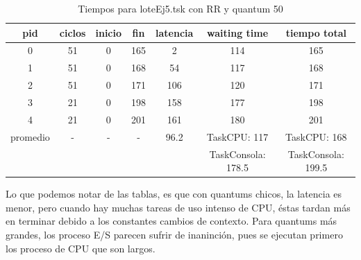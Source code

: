 \begin{table}
\centering
\begin{tabular}{ | c | c | c | c | c | c | c | }
  \hline			
  pid & ciclos & inicio & fin & latencia & waiting time & tiempo total  \\
  \hline
0 & 51 & 0 & 165 & 2 & 114 & 165\\
1 & 51 & 0 & 168 & 54 & 117 & 168\\
2 & 51 & 0 & 171 & 106 & 120 & 171\\
3 & 21 & 0 & 198 & 158 & 177 & 198\\
4 & 21 & 0 & 201 & 161 & 180 & 201\\
  \hline
promedio & - & - & - & 96.2 & TaskCPU: 117  & TaskCPU: 168 \\
                & &  &  &  & TaskConsola: 178.5  & TaskConsola: 199.5\\
  \hline
\end{tabular}
\caption{Tiempos para loteEj5.tsk con RR y quantum 50}\label{tab:ej5q50}
\end{table}
Lo que podemos notar de las tablas, es que con quantums chicos, la latencia es menor, pero cuando hay muchas tareas de uso intenso de CPU, éstas tardan más en terminar debido a los constantes cambios de contexto. Para quantums más grandes, los proceso E/S parecen sufrir de inaninción, pues se ejecutan primero los proceso de CPU que son largos.\par